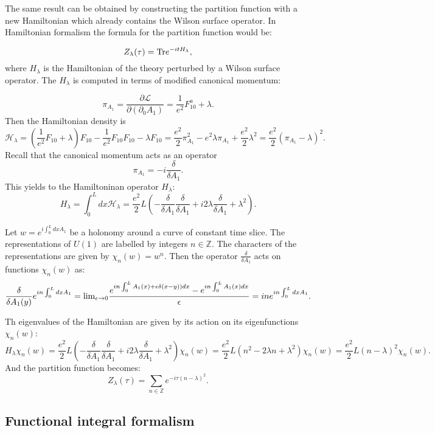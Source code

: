 \documentclass[11pt]{report}
\theoremstyle{plain}
\theoremstyle{definition}
\theoremstyle{remark}
\theoremstyle{remark}
\numberwithin{equation}{section}
\begin{document}
The same result can be obtained by constructing the partition function with a new Hamiltonian which already contains the Wilson surface operator. 
In Hamiltonian formalism the formula for the partition function would be:

 $$ 
Z_{\lambda}(\tau) = {\rm Tr} e^{-itH_{\lambda}},
$$
where $H_{\lambda}$ is the Hamiltonian of the theory perturbed by a Wilson surface operator. 
The $H_{\lambda}$ is computed in terms of modified canonical momentum:

$$
\pi_{A_1} = \frac{\partial \mathcal{L}}{\partial (\partial_0 A_1)} = \frac{1}{e^2}F^a_{10} + \lambda . 
$$
Then the Hamiltonian density is
%
$$
\mathcal{H_{\lambda}} = (\frac{1}{e^2}F_{10} + \lambda)F_{10} - \frac{1}{e^2}F_{10}F_{10} - \lambda F_{10} = \frac{e^2}{2}\pi_{A_1}^2 - e^2 \lambda \pi_{A_1} + \frac{e^2}{2} \lambda^2  = \frac{e^2}{2}(\pi_{A_1} - \lambda)^2.
$$
Recall that the canonical momentum acts as an operator 
%
$$
\pi_{A_1} = -i\frac{\delta}{\delta A_1}.
$$
This yields to the Hamiltoninan operator $H_{\lambda}$:
%
$$ H_{\lambda} = \int_0^L dx \mathcal{H_{\lambda}} = \frac{e^2}{2}L ( -\frac{\delta}{\delta A_1}\frac{\delta}{\delta A_1} +i 2\lambda \frac{\delta}{\delta A_1} + \lambda ^2).
$$

Let $w = e^{i\int_0^L dx A_1}$ be a holonomy around a curve of constant time slice. The representations of $U(1)$ are labelled by integers $n \in \mathbb{Z}$. The characters of the representations are given by $\chi_n(w) = w^n$. Then the operator $\frac{\delta}{\delta A_1}$ acts on functions $\chi_n(w)$ as:
%
$$
\frac{\delta}{\delta A_1(y)}e^{in\int_0^L dx A_1} = {\rm lim}_{\epsilon \to 0}\frac{ e^{in\int_0^L A_1(x) + \epsilon \delta(x-y))dx} -  e^{in\int_0^L A_1(x)dx}}{\epsilon}=in e^{in\int_0^L dx A_1}.
$$

Th eigenvalues of the Hamiltonian are given by its action on its eigenfunctions $\chi_n(w)$:
%
$$
H_{\lambda} \chi_n(w) = \frac{e^2}{2}L ( -\frac{\delta}{\delta A_1}\frac{\delta}{\delta A_1} +i 2\lambda \frac{\delta}{\delta A_1} + \lambda ^2) \chi_n(w)  = \frac{e^2}{2} L  (n^2 - 2\lambda n +\lambda ^2) \chi_n(w) = \frac{e^2}{2} L  (n-\lambda) ^2 \chi_n(w).
$$
And the partition function becomes:
%
$$
Z_{\lambda}(\tau) = \sum_{n \in \mathbb{Z}} e^{ -i\tau (n - \lambda )^2}.
$$			


 

\subsection{Functional integral formalism}
\end{document}
